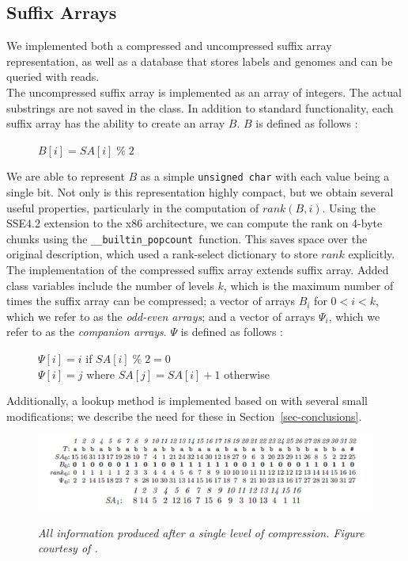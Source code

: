 \documentclass{article}
\newcommand{\popcnt}{\texttt{\_\_builtin\_popcount }}
\begin{document}
\subsection{Suffix Arrays}
\label{subsec-sa}
We implemented both a compressed and uncompressed suffix array representation, as well as a database that stores labels and genomes and can be queried with reads.\\
\indent The uncompressed suffix array is implemented as an array of integers. The actual substrings are not saved in the class. In addition to standard functionality, each suffix array has the ability to create an array $B$. $B$ is defined as follows \cite{GV05}:
\begin{figure}[H]
$B[i] = SA[i]\;\%\;2$
\end{figure}
\indent We are able to represent $B$ as a simple \texttt{unsigned char\*} with each value being a single bit. Not only is this representation highly compact, but we obtain several useful properties, particularly in the computation of $rank(B,i)$. Using the SSE4.2 extension to the x86 architecture, we can compute the rank on 4-byte chunks using the \popcnt function. This saves space over the original description, which used a rank-select dictionary to store $rank$ explicitly.\\
\indent The implementation of the compressed suffix array extends suffix array. Added class variables include the number of levels $k$, which is the maximum number of times the suffix array can be compressed; a vector of arrays $B_i$ for $0 < i < k$, which we refer to as the \emph{odd-even arrays}; and a vector of arrays $\Psi_i$, which we refer to as the \emph{companion arrays}. $\Psi$ is defined as follows \cite{GV05}:
\begin{figure}[H]
\label{fig-defn-psi}
$\Psi[i] = i$ if $SA[i]\;\%\; 2 = 0$\\
$\Psi[i] = j$ where $SA[j] = SA[i]+1$ otherwise
\end{figure}
Additionally, a lookup method is implemented based on \cite{GV05} with several small modifications; we describe the need for these in Section~\ref{sec-conclusions}.\\
\begin{figure}[H]
\label{fig-csa-repr}
\caption{\small\small\textit{All information produced after a single level of compression. Figure courtesy of \cite{GV05}.}}
\includegraphics[width=12cm]{csa.png}\\
\end{figure}
\end{document}
